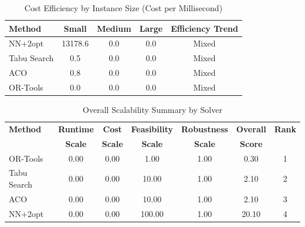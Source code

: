 \begin{table}[ht]
\centering
\caption{Cost Efficiency by Instance Size (Cost per Millisecond)}
\label{tab:cost_efficiency}
\begin{tabular}{lcccc}
\toprule
\textbf{Method} & \textbf{Small} & \textbf{Medium} & \textbf{Large} & \textbf{Efficiency Trend} \\
\midrule
NN+2opt & 13178.6 & 0.0 & 0.0 & Mixed \\
Tabu Search & 0.5 & 0.0 & 0.0 & Mixed \\
ACO & 0.8 & 0.0 & 0.0 & Mixed \\
OR-Tools & 0.0 & 0.0 & 0.0 & Mixed \\
\bottomrule
\end{tabular}
\end{table}

\begin{table}[ht]
\centering
\caption{Overall Scalability Summary by Solver}
\label{tab:scalability_summary}
\begin{tabular}{lcccccc}
\toprule
\textbf{Method} & \textbf{Runtime} & \textbf{Cost} & \textbf{Feasibility} & \textbf{Robustness} & \textbf{Overall} & \textbf{Rank} \\
\textbf{} & \textbf{Scale} & \textbf{Scale} & \textbf{Scale} & \textbf{Scale} & \textbf{Score} & \textbf{} \\
\midrule
OR-Tools & 0.00 & 0.00 & 1.00 & 1.00 & 0.30 & 1 \\
Tabu Search & 0.00 & 0.00 & 10.00 & 1.00 & 2.10 & 2 \\
ACO & 0.00 & 0.00 & 10.00 & 1.00 & 2.10 & 3 \\
NN+2opt & 0.00 & 0.00 & 100.00 & 1.00 & 20.10 & 4 \\
\bottomrule
\end{tabular}
\end{table}
